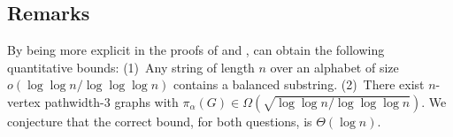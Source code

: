 \documentclass{patmorin}
\begin{document}
\subsection{Remarks}

By being more explicit in the proofs of  and , can obtain the following quantitative bounds: (1)~Any string of length $n$ over an alphabet of size $o(\log\log n/\log\log\log n)$ contains a balanced substring.  (2)~There exist $n$-vertex pathwidth-3 graphs with $\pi_\alpha(G)\in \Omega(\sqrt{\log\log n/\log\log\log n})$.  We conjecture that the correct bound, for both questions, is $\Theta(\log n)$.



\end{document}
